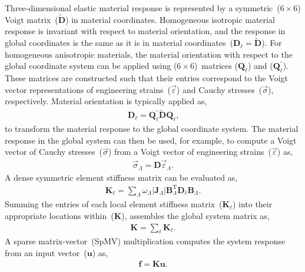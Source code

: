 \documentclass[]             %
{NASA}                       %
\begin{document}
Three-dimensional elastic material response is represented by a symmetric~($6\times6$)
Voigt matrix~($\widetilde{\mathbf{D}}$) in material coordinates.
 Homogeneous isotropic material response is invariant with respect to material orientation,
 and the response in global coordinates is the same as it is in material
 coordinates~($\mathbf{D}_{\ell}=\widetilde{\mathbf{D}}$).
 For homogeneous anisotropic materials, the material orientation with respect to the
 global coordinate system can be applied using ($6\times6$)~matrices
 ($\mathbf{Q}_{\ell}$) and ($\mathbf{Q}_{\ell}^{'}$).
 These matrices are constructed such that their entries correspond to the
 Voigt vector representations of engineering strains~($\vec{\varepsilon}$)
 and Cauchy stresses~($\vec{\sigma}$), respectively.
 Material orientation is typically applied as,
\begin{eqnarray}
\mathbf{D}_{\ell} = \mathbf{Q}_{\ell}^{'}\widetilde{\mathbf{D}}\mathbf{Q}_{\ell}\text{,}\label{eq:material-voigt-rotate}
\end{eqnarray}
to transform the material response to the global coordinate system.
 The material response in the global system can then be used, for example,
 to compute a Voigt vector of Cauchy stresses~($\vec{\sigma}$) from a Voigt vector of
 engineering strains~($\vec{\varepsilon}$) as,
\begin{eqnarray}
\vec{\sigma}_{\Lambda} = \mathbf{D}\vec{\varepsilon}_{\Lambda}\text{.}\label{eq:stress-from-engineering-strain-global}
\end{eqnarray}
A dense symmetric element stiffness matrix can be evaluated as,
\begin{eqnarray}
\label{eq:element-stiffness-matrix-traditional}
\mathbf{K}_{\ell} = \sum_{\Lambda}\omega_{\Lambda}|\mathbf{J}_{\Lambda}|\mathbf{B}_{\Lambda}^\mathrm{T}\mathbf{D}_{\ell}\mathbf{B}_{\Lambda}\text{.}\label{eq:la-elem-stiff}
\end{eqnarray}
Summing the entries of each local element stiffness matrix~($\mathbf{K}_{\ell}$)
into their appropriate locations within~($\mathbf{K}$), assembles the global system matrix as, 
\begin{eqnarray}
\mathbf{K} = \sum_{\ell}\mathbf{K}_{\ell}\text{.}\label{eq:global-stiff-assemble}
\end{eqnarray}
A sparse matrix-vector~(SpMV) multiplication computes the system response from an input vector~($\mathbf{u}$) as,
\begin{eqnarray}
\mathbf{f} = \mathbf{K}\mathbf{u}\text{.}
\end{eqnarray}
\end{document}
